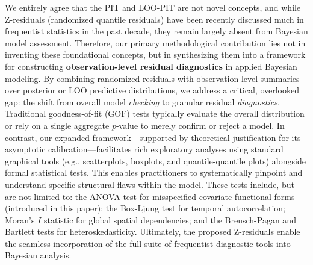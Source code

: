 \documentclass[11pt]{article}
\begin{document}
We entirely agree that the PIT and LOO-PIT are not novel concepts, and while Z-residuals (randomized quantile residuals) have been recently discussed much in frequentist statistics in the past decade, they remain largely absent from Bayesian model assessment. Therefore, our primary methodological contribution lies not in inventing these foundational concepts, but in synthesizing them into a framework for constructing \textbf{observation-level residual diagnostics} in applied Bayesian modeling. By combining randomized residuals with observation-level summaries over posterior or LOO predictive distributions, we address a critical, overlooked gap: the shift from overall model \textit{checking} to granular residual \textit{diagnostics}. Traditional goodness-of-fit (GOF) tests typically evaluate the overall distribution or rely on a single aggregate $p$-value to merely confirm or reject a model. In contrast, our expanded framework---supported by theoretical justification for its asymptotic calibration---facilitates rich exploratory analyses using standard graphical tools (e.g., scatterplots, boxplots, and quantile-quantile plots) alongside formal statistical tests. This enables practitioners to systematically pinpoint and understand specific structural flaws within the model. These tests include, but are not limited to: the ANOVA test for misspecified covariate functional forms (introduced in this paper); the Box-Ljung test for temporal autocorrelation; Moran's $I$ statistic for global spatial dependencies; and the Breusch-Pagan and Bartlett tests for heteroskedasticity. Ultimately, the proposed Z-residuals enable the seamless incorporation of the full suite of frequentist diagnostic tools into Bayesian analysis.
\end{document}
